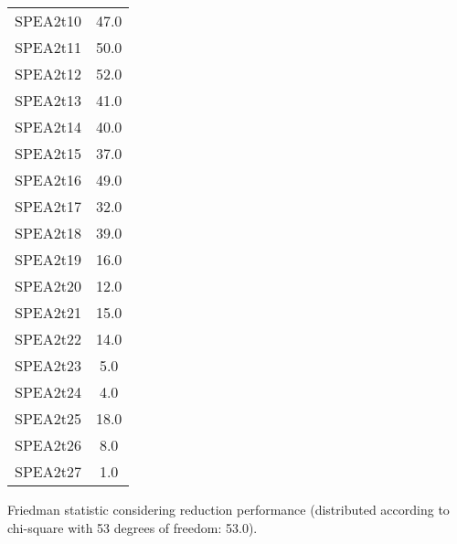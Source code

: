 \documentclass{article}
\begin{document}
\begin{table}[!htp]
\begin{tabular}{c|c}
SPEA2t10&47.0\\
SPEA2t11&50.0\\
SPEA2t12&52.0\\
SPEA2t13&41.0\\
SPEA2t14&40.0\\
SPEA2t15&37.0\\
SPEA2t16&49.0\\
SPEA2t17&32.0\\
SPEA2t18&39.0\\
SPEA2t19&16.0\\
SPEA2t20&12.0\\
SPEA2t21&15.0\\
SPEA2t22&14.0\\
SPEA2t23&5.0\\
SPEA2t24&4.0\\
SPEA2t25&18.0\\
SPEA2t26&8.0\\
SPEA2t27&1.0\\
\end{tabular}
\end{table}


Friedman statistic considering reduction performance (distributed according to chi-square with 53 degrees of freedom: 53.0).
\end{document}
